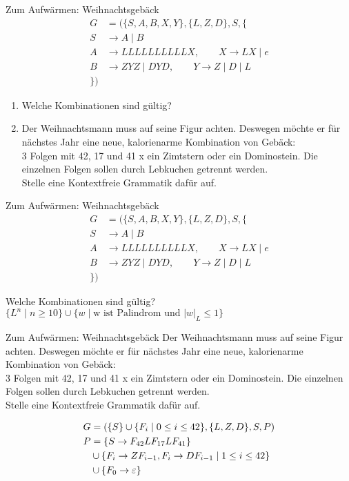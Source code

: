 \begin{frame}{Zum Aufwärmen: Weihnachtsgebäck}
	\begin{align*}
		G &= (\{S, A, B, X, Y\}, \{L, Z, D\}, S, \{ \\
		S &\to A \mid B\\
		A &\to LLLLLLLLLLX, \qquad X \to LX \mid e\\
		B &\to ZYZ \mid DYD, \qquad Y \to Z \mid D \mid L\\
		\})
	\end{align*}
	\begin{enumerate}
		\item Welche Kombinationen sind gültig?\\[0.5em]
		\item Der Weihnachtsmann muss auf seine Figur achten. Deswegen möchte er für nächstes Jahr eine neue, kalorienarme Kombination von Gebäck:\\
		3 Folgen mit 42, 17 und 41 x ein Zimtstern oder ein Dominostein. Die einzelnen Folgen sollen durch Lebkuchen getrennt werden.\\
		Stelle eine Kontextfreie Grammatik dafür auf.
	\end{enumerate}
\end{frame}

\begin{frame}{Zum Aufwärmen: Weihnachtsgebäck}
	\begin{align*}
		G &= (\{S, A, B, X, Y\}, \{L, Z, D\}, S, \{ \\
		S &\to A \mid B\\
		A &\to LLLLLLLLLLX, \qquad X \to LX \mid e\\
		B &\to ZYZ \mid DYD, \qquad Y \to Z \mid D \mid L\\
		\})
	\end{align*}

	Welche Kombinationen sind gültig?\\[0.5em] \pause
	$\{ L^n \mid n \geq 10\} \cup \{w \mid \text{w ist Palindrom und } |w|_L \leq 1\}$
\end{frame}

\begin{frame}{Zum Aufwärmen: Weihnachtsgebäck}
	Der Weihnachtsmann muss auf seine Figur achten. Deswegen möchte er für nächstes Jahr eine neue, kalorienarme Kombination von Gebäck:\\
	3 Folgen mit 42, 17 und 41 x ein Zimtstern oder ein Dominostein. Die einzelnen Folgen sollen durch Lebkuchen getrennt werden.\\
	Stelle eine Kontextfreie Grammatik dafür auf.
	
	\pause
	\begin{align*}
		G &= (\{S\} \cup \{F_i \mid 0 \leq i \leq 42 \}, \{L, Z, D\}, S, P)\\
		P &= \{S \to F_{42}LF_{17}LF_{41} \}\\
		  &\cup \{F_i \to ZF_{i-1}, F_i \to DF_{i-1} \mid 1 \leq i \leq 42 \} \\
		  &\cup \{F_0 \to \varepsilon \}
	\end{align*}
\end{frame}

